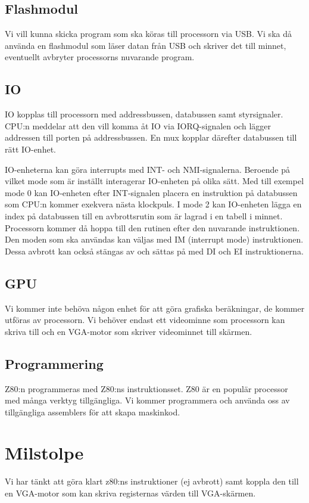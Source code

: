 \documentclass[12pt]{article}
\begin{document}
\subsection{Flashmodul}
Vi vill kunna skicka program som ska köras till processorn via USB. Vi ska då
använda en flashmodul som läser datan från USB och skriver det till minnet,
eventuellt avbryter processorns nuvarande program.

\subsection{IO}
IO kopplas till processorn med addressbussen, databussen samt styrsignaler.
CPU:n meddelar att den vill komma åt IO via IORQ-signalen och lägger addressen
till porten på addressbussen. En mux kopplar därefter databussen till rätt
IO-enhet. 

IO-enheterna kan göra interrupts med INT- och NMI-signalerna. Beroende på
vilket mode som är inställt interagerar IO-enheten på olika sätt. Med till
exempel mode 0 kan IO-enheten efter INT-signalen placera en instruktion på
databussen som CPU:n kommer exekvera nästa klockpuls. I mode 2 kan IO-enheten
lägga en index på databussen till en avbrottsrutin som är lagrad i en tabell i
minnet. Processorn kommer då hoppa till den rutinen efter den nuvarande
instruktionen. Den moden som ska användas kan väljas med IM (interrupt mode)
instruktionen. Dessa avbrott kan också stängas av och sättas på med DI och EI
instruktionerna.

\subsection{GPU}
Vi kommer inte behöva någon enhet för att göra grafiska beräkningar, de kommer
utföras av processorn. Vi behöver endast ett videominne som processorn kan
skriva till och en VGA-motor som skriver videominnet till skärmen.

\subsection{Programmering}
Z80:n programmeras med Z80:ns instruktionsset. Z80 är en populär processor med
många verktyg tillgängliga. Vi kommer programmera och använda oss av
tillgängliga assemblers för att skapa maskinkod.

\section{Milstolpe}
Vi har tänkt att göra klart z80:ns instruktioner (ej avbrott) samt koppla den
till en VGA-motor som kan skriva registernas värden till VGA-skärmen.
\end{document}
